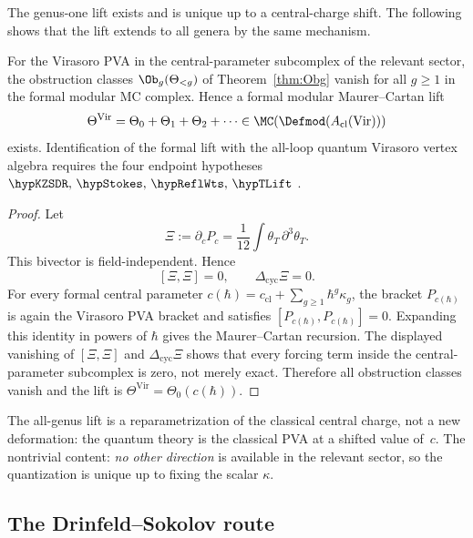 The genus-one lift exists and is unique up to a central-charge shift.
The following shows that the lift extends to all genera by the same mechanism.

\begin{proposition}
\label{prop:virasoro-higher-genus}
For the Virasoro PVA in the central-parameter subcomplex of the
relevant sector, the obstruction classes $\Ob_g(\Theta_{<g})$ of
Theorem~\textup{\ref{thm:Obg}} vanish for all $g\ge 1$ in the formal
modular MC complex. Hence a formal modular Maurer--Cartan lift
\[
\Theta^{\mathrm{Vir}}
= \Theta_0 + \Theta_1 + \Theta_2 + \cdots
\in \MC(\Defmod(A_{\mathrm{cl}}(\mathrm{Vir})))
\]
exists. Identification of the formal lift with the all-loop quantum
Virasoro vertex algebra requires the four endpoint hypotheses
$\hypKZSDR,\,\hypStokes,\,\hypReflWts,\,\hypTLift$ \cite{KZ25,Costello2011Renorm,CG17,LurieHA}.
\end{proposition}

\begin{proof}
Let
\[
 \Xi:=\partial_c P_c=\frac{1}{12}\int \theta_T\,\partial^3\theta_T.
\]
This bivector is field-independent. Hence
\[
 [\Xi,\Xi]=0,\qquad
 \Delta_{\mathrm{cyc}}\Xi=0.
\]
For every formal central parameter
$c(\hbar)=c_{\mathrm{cl}}+\sum_{g\geq1}\hbar^g\kappa_g$, the bracket
$P_{c(\hbar)}$ is again the Virasoro PVA bracket and satisfies
$[P_{c(\hbar)},P_{c(\hbar)}]=0$. Expanding this identity in powers of
$\hbar$ gives the Maurer--Cartan recursion. The displayed vanishing of
$[\Xi,\Xi]$ and $\Delta_{\mathrm{cyc}}\Xi$ shows that every forcing term
inside the central-parameter subcomplex is zero, not merely exact.
Therefore all obstruction classes vanish and the lift is
$\Theta^{\mathrm{Vir}}=\Theta_0(c(\hbar))$.
\end{proof}

\begin{remark}
The all-genus lift is a reparametrization of the classical central charge,
not a new deformation: the quantum theory is the classical PVA at a shifted
value of~$c$. The nontrivial content: \emph{no other direction} is available
in the relevant sector, so the quantization is unique up to fixing the
scalar $\kappa$.
\end{remark}

\subsection{The Drinfeld--Sokolov route}
\label{subsec:virasoro-ds-route}

